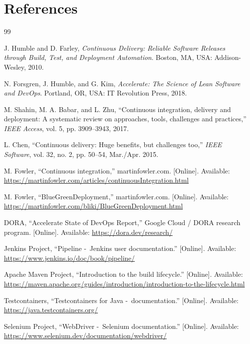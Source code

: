 \documentclass[10pt,a4paper]{article}
\begin{document}
\section{References}
{\fontsize{8.6}{10.3}\selectfont
\begin{thebibliography}{99}
\setlength{\itemsep}{1.5pt}\setlength{\parskip}{0pt}

 J. Humble and D. Farley, \textit{Continuous Delivery: Reliable Software
Releases through Build, Test, and Deployment Automation}. Boston, MA, USA: Addison-Wesley, 2010.

 N. Forsgren, J. Humble, and G. Kim, \textit{Accelerate: The Science of
Lean Software and DevOps}. Portland, OR, USA: IT Revolution Press, 2018.

 M. Shahin, M. A. Babar, and L. Zhu, ``Continuous integration, delivery and
deployment: A systematic review on approaches, tools, challenges and practices,''
\textit{IEEE Access}, vol. 5, pp. 3909--3943, 2017.

 L. Chen, ``Continuous delivery: Huge benefits, but challenges too,''
\textit{IEEE Software}, vol. 32, no. 2, pp. 50--54, Mar./Apr. 2015.

 M. Fowler, ``Continuous integration,'' martinfowler.com. [Online]. Available:
\url{https://martinfowler.com/articles/continuousIntegration.html}

 M. Fowler, ``BlueGreenDeployment,'' martinfowler.com. [Online]. Available:
\url{https://martinfowler.com/bliki/BlueGreenDeployment.html}

 DORA, ``Accelerate State of DevOps Report,'' Google Cloud / DORA research
program. [Online]. Available: \url{https://dora.dev/research/}

 Jenkins Project, ``Pipeline -\ Jenkins user documentation.''
[Online]. Available: \url{https://www.jenkins.io/doc/book/pipeline/}

 Apache Maven Project, ``Introduction to the build lifecycle.'' [Online].
Available: \url{https://maven.apache.org/guides/introduction/introduction-to-the-lifecycle.html}

 Testcontainers, ``Testcontainers for Java -\ documentation.''
[Online]. Available: \url{https://java.testcontainers.org/}

 Selenium Project, ``WebDriver -\ Selenium documentation.''
[Online]. Available: \url{https://www.selenium.dev/documentation/webdriver/}


\end{thebibliography}}
\end{document}
